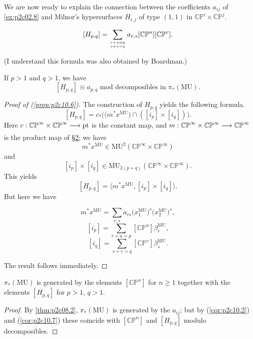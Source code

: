 \documentclass[../main]{subfiles}
\begin{document}
We are now ready to explain the connection between the coefficients $a_{ij}$ of \ref{ex:p2c02.8} and Milnor's hypersurfaces $H_{i, j}$ of type $(1, 1)$ in $\mathbb {CP}^i \times \mathbb {CP}^j$.

\begin{proposition}
\label{prop:p2c10.6}
\[[H_{p, q}] = \sum_{{r + u = p} \atop {s + v = q}} a_{r, s} [\mathbb {CP}^u] [\mathbb {CP}^v].\]
\end{proposition}
(I understand this formula was also obtained by Boardman.)
\begin{corollary}
\label{cor:p2c10.7}
If $p > 1$ and $q > 1$, we have \[[H_{p, q}] \equiv a_{p, q} \text { mod decomposibles in } \pi_\ast(\mathrm {MU}).\]
\end{corollary}

\begin{proof}[Proof of (\ref{prop:p2c10.6})]
The construction of $H_{p, q}$ yields the following formula. \[[H_{p, q}] = c_\ast \big(\big(m^\ast x^{\mathrm{MU}}\big) \cap ([i_p] \times [i_q])\big).\] Here $c : \mathbb {CP}^\infty \times \mathbb {CP}^\infty \lar{} \mathrm{pt}$ is the constant map, and $m : \mathbb {CP}^\infty \times \mathbb {CP}^\infty \lar{} \mathbb {CP}^\infty$ is the product map of \hyperref[sec:p2c2]{\S 2}; we have \[m^\ast x^{\mathrm{MU}} \in \mathrm{MU}^2(\mathbb {CP}^\infty \times \mathbb {CP}^\infty)\] and \[[i_p] \times [i_q] \in \mathrm{MU}_{2(p + q)} (\mathbb {CP}^\infty \times \mathbb {CP}^\infty).\] This yields \[[H_{p, q}] = \big\langle m^\ast x^{\mathrm{MU}}, [i_p] \times [i_q]\big\rangle.\] But here we have

\[m^\ast x^{\mathrm{MU}} = \sum_{r, s} a_{rs} \big(x_1^{\mathrm{MU}}\big)^r \big(x_2^{\mathrm{MU}}\big)^s,\]
\[[i_p] = \sum_{r + u = p} [\mathbb {CP}^u] \beta_r^{\mathrm{MU}},\]
\[[i_q] = \sum_{s + v = q} [\mathbb {CP}^v] \beta_s^{\mathrm{MU}}.\]

The result follows immediately. 
\end{proof} 

\begin{corollary}
\label{cor:p2c10.8}
$\pi_\ast(\mathrm {MU})$ is generated by the elements $[\mathbb {CP}^n]$ for $n \ge 1$ together with the elements $[H_{p, q}]$ for $p > 1$, $q > 1$. 
\end{corollary}

\begin{proof}
By \ref{thm:p2c08.2}, $\pi_\ast(\mathrm{MU})$ is generated by the $a_{ij}$; but by (\ref{cor:p2c10.2}) and (\ref{cor:p2c10.7}) these coincide with $[\mathbb {CP}^n]$ and $[H_{p, q}]$ modulo decomposibles. 
\end{proof} 
\end{document}

